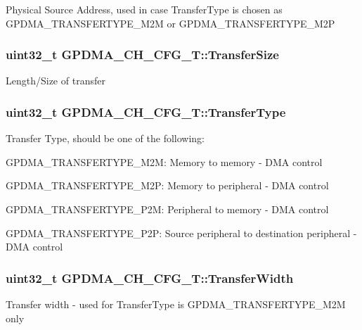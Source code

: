 Physical Source Address, used in case Transfer\-Type is chosen as G\-P\-D\-M\-A\-\_\-\-T\-R\-A\-N\-S\-F\-E\-R\-T\-Y\-P\-E\-\_\-\-M2\-M or G\-P\-D\-M\-A\-\_\-\-T\-R\-A\-N\-S\-F\-E\-R\-T\-Y\-P\-E\-\_\-\-M2\-P \hypertarget{structGPDMA__CH__CFG__T_a5666efb9edb055974b590443ea45ed7b}{
\subsubsection[{Transfer\-Size}]{\setlength{\rightskip}{0pt plus 5cm}uint32\-\_\-t G\-P\-D\-M\-A\-\_\-\-C\-H\-\_\-\-C\-F\-G\-\_\-\-T\-::\-Transfer\-Size}}\label{structGPDMA__CH__CFG__T_a5666efb9edb055974b590443ea45ed7b}
Length/\-Size of transfer \hypertarget{structGPDMA__CH__CFG__T_a6c21f3fe48e5e23443a324f9a42a3886}{
\subsubsection[{Transfer\-Type}]{\setlength{\rightskip}{0pt plus 5cm}uint32\-\_\-t G\-P\-D\-M\-A\-\_\-\-C\-H\-\_\-\-C\-F\-G\-\_\-\-T\-::\-Transfer\-Type}}\label{structGPDMA__CH__CFG__T_a6c21f3fe48e5e23443a324f9a42a3886}
Transfer Type, should be one of the following\-:
\begin{DoxyItemize}
\item G\-P\-D\-M\-A\-\_\-\-T\-R\-A\-N\-S\-F\-E\-R\-T\-Y\-P\-E\-\_\-\-M2\-M\-: Memory to memory -\/ D\-M\-A control
\item G\-P\-D\-M\-A\-\_\-\-T\-R\-A\-N\-S\-F\-E\-R\-T\-Y\-P\-E\-\_\-\-M2\-P\-: Memory to peripheral -\/ D\-M\-A control
\item G\-P\-D\-M\-A\-\_\-\-T\-R\-A\-N\-S\-F\-E\-R\-T\-Y\-P\-E\-\_\-\-P2\-M\-: Peripheral to memory -\/ D\-M\-A control
\item G\-P\-D\-M\-A\-\_\-\-T\-R\-A\-N\-S\-F\-E\-R\-T\-Y\-P\-E\-\_\-\-P2\-P\-: Source peripheral to destination peripheral -\/ D\-M\-A control 
\end{DoxyItemize}\hypertarget{structGPDMA__CH__CFG__T_a7aff974420b56393365cc335015ba8df}{
\subsubsection[{Transfer\-Width}]{\setlength{\rightskip}{0pt plus 5cm}uint32\-\_\-t G\-P\-D\-M\-A\-\_\-\-C\-H\-\_\-\-C\-F\-G\-\_\-\-T\-::\-Transfer\-Width}}\label{structGPDMA__CH__CFG__T_a7aff974420b56393365cc335015ba8df}
Transfer width -\/ used for Transfer\-Type is G\-P\-D\-M\-A\-\_\-\-T\-R\-A\-N\-S\-F\-E\-R\-T\-Y\-P\-E\-\_\-\-M2\-M only 

